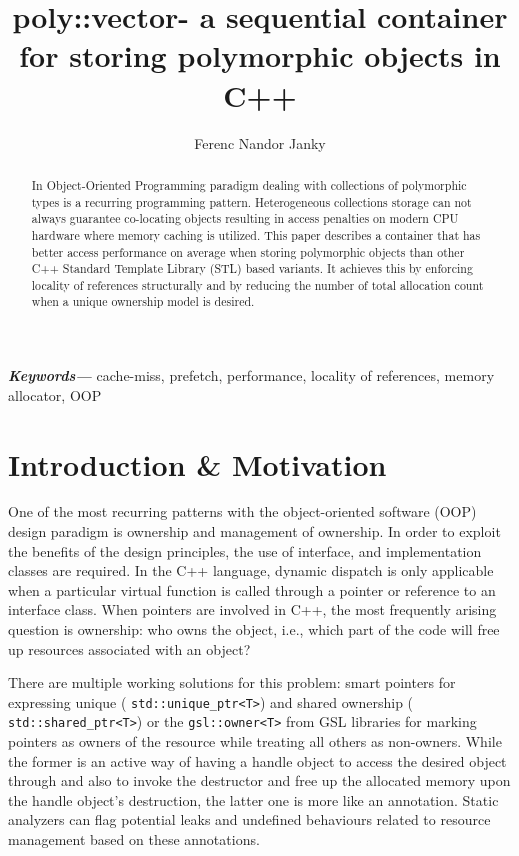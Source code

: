 \documentclass[a4paper,12pt]{article}
\author{Ferenc Nandor Janky}
\date{}
\title{poly::vector- a sequential container for storing polymorphic objects in C++}
\providecommand{\keywords}[1]
{
  \small	
  \textbf{\textit{Keywords---}} #1
}
\begin{document}
\maketitle

\begin{abstract}
In Object-Oriented Programming paradigm dealing with collections of polymorphic types is a recurring programming pattern. Heterogeneous collections storage can not always guarantee co-locating objects resulting in access penalties on modern CPU hardware where memory caching is utilized.
This paper describes a container that has better access performance on average when storing polymorphic objects than other C++ Standard Template Library (STL) based variants. It achieves this by enforcing locality of references structurally and by reducing the number of total allocation count when a unique ownership model is desired.

\end{abstract}
 
\keywords{cache-miss, prefetch, performance, locality of references, memory allocator, OOP}



\section{Introduction \& Motivation}

One of the most recurring patterns with the object-oriented software (OOP) design paradigm is ownership and management of ownership. In order to exploit the benefits of the design principles, the use of interface, and implementation classes are required. In the C++ language, dynamic dispatch is only applicable when a particular virtual function is called through a pointer or reference to an interface class. When pointers are involved in C++, the most frequently arising question is ownership: who owns the object, i.e.,  which part of the code will free up resources associated with an object? 

There are multiple working solutions for this problem: smart pointers for expressing unique ( \lstinline{std::unique_ptr<T>}) and shared ownership ( \lstinline{std::shared_ptr<T>}) or the  \lstinline{gsl::owner<T>} from GSL libraries for marking pointers as owners of the resource while treating all others as non-owners. While the former is an active way of having a handle object to access the desired object through and also to invoke the destructor and free up the allocated memory upon the handle object's destruction, the latter one is more like an annotation. Static analyzers can flag potential leaks and undefined behaviours related to resource management based on these annotations. 
\end{document}
